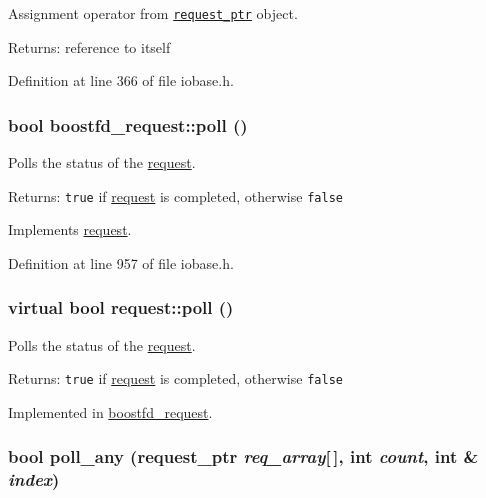 Assignment operator from {\tt \hyperlink{classrequest__ptr}{request\_\-ptr}} object. 

\begin{Desc}
\item[Returns:]reference to itself \end{Desc}


Definition at line 366 of file iobase.h.\hypertarget{group__iolayer_g3ec494e77ffa0621380e54cdc4cda657}{
\subsubsection[{poll}]{\setlength{\rightskip}{0pt plus 5cm}bool boostfd\_\-request::poll ()}}
\label{group__iolayer_g3ec494e77ffa0621380e54cdc4cda657}


Polls the status of the \hyperlink{classrequest}{request}. 

\begin{Desc}
\item[Returns:]{\tt true} if \hyperlink{classrequest}{request} is completed, otherwise {\tt false} \end{Desc}


Implements \hyperlink{group__iolayer_ge93809a6f19558a9f0f98f50cd69aa2f}{request}.

Definition at line 957 of file iobase.h.\hypertarget{group__iolayer_ge93809a6f19558a9f0f98f50cd69aa2f}{
\subsubsection[{poll}]{\setlength{\rightskip}{0pt plus 5cm}virtual bool request::poll ()}}
\label{group__iolayer_ge93809a6f19558a9f0f98f50cd69aa2f}


Polls the status of the \hyperlink{classrequest}{request}. 

\begin{Desc}
\item[Returns:]{\tt true} if \hyperlink{classrequest}{request} is completed, otherwise {\tt false} \end{Desc}


Implemented in \hyperlink{group__iolayer_g3ec494e77ffa0621380e54cdc4cda657}{boostfd\_\-request}.\hypertarget{group__iolayer_gcc646374095debeec8ade492b695ad37}{
\subsubsection[{poll\_\-any}]{\setlength{\rightskip}{0pt plus 5cm}bool poll\_\-any ({\bf request\_\-ptr} {\em req\_\-array}\mbox{[}$\,$\mbox{]}, \/  int {\em count}, \/  int \& {\em index})}}
\label{group__iolayer_gcc646374095debeec8ade492b695ad37}


